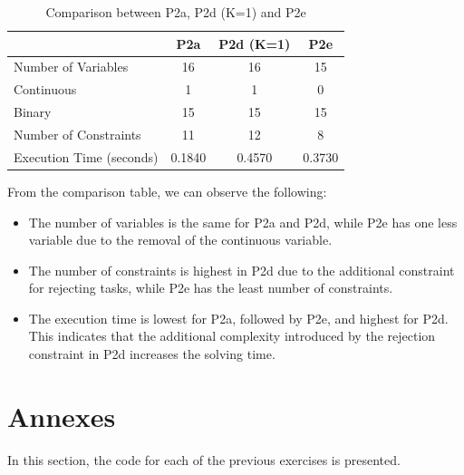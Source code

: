 \documentclass{article}
\begin{document}
\begin{table}[ht]
\centering
\caption{Comparison between P2a, P2d (K=1) and P2e}
\label{tab:comparison_models}
\small
\begin{tabular}{l|c|c|c}
 & \textbf{P2a} & \textbf{P2d (K=1)} & \textbf{P2e} \\
\hline
Number of Variables         & 16                & 16              & 15 \\
\quad Continuous            & 1                 & 1               & 0 \\
\quad Binary                & 15                & 15              & 15 \\
\hline
Number of Constraints       & 11                & 12              & 8 \\
\hline
Execution Time (seconds)    & 0.1840           & 0.4570           & 0.3730 \\
\end{tabular}
\end{table}

From the comparison table, we can observe the following:
\begin{itemize}
    \item The number of variables is the same for P2a and P2d, while P2e has one less variable due to the removal of the continuous variable.
    \item The number of constraints is highest in P2d due to the additional constraint for rejecting tasks, while P2e has the least number of constraints.
    \item The execution time is lowest for P2a, followed by P2e, and highest for P2d. This indicates that the additional complexity introduced by the rejection constraint in P2d increases the solving time.
\end{itemize}

\newpage
\section{Annexes}
In this section, the code for each of the previous exercises is presented.






\end{document}

